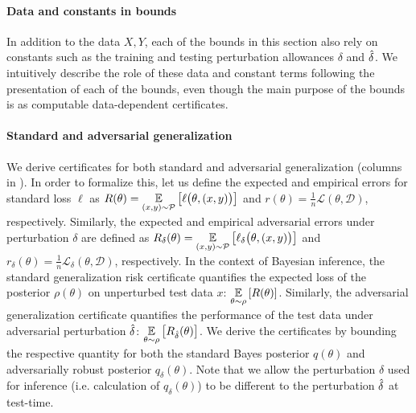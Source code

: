 \paragraph{Data and constants in bounds} In addition to the data $X, Y$, each of the bounds in this section also rely on constants such as the training and testing perturbation allowances $\delta$ and $\hat{\delta}$.
We intuitively describe the role of these data and constant terms following the presentation of each of the bounds, even though the main purpose of the bounds is as computable data-dependent certificates.

\paragraph{Standard and adversarial generalization}
We derive certificates for both standard and adversarial generalization (columns in ). In order to formalize this, let us define the expected and empirical errors for standard loss $\ell$ as $R(\theta)=\underset{(x,y) \sim \mathcal{P}}{\mathbb{E}}\left[\ell\big(\theta, (x,y)\big)\right]$ and $r(\theta)=\frac{1}{n} \mathcal{L}(\theta, \mathcal{D})$, respectively. Similarly, the expected and empirical adversarial errors under perturbation $\delta$ are defined as $ {R}_\delta(\theta)=\underset{(x,y) \sim \mathcal{P}}{\mathbb{E}}\left[ {\ell}_\delta\big(\theta, (x,y)\big)\right]$ and $ {r}_\delta(\theta)=\frac{1}{n}  \mathcal{L}_\delta(\theta, \mathcal{D})$, respectively. 
In the context of Bayesian inference, the standard generalization risk certificate quantifies the expected loss of the posterior $\rho(\theta)$ on unperturbed test data $x$: $\underset{\theta \sim \rho}{\mathbb{E}}\left[R(\theta)\right]$. %
Similarly, the adversarial generalization certificate quantifies the performance
of the test data under adversarial perturbation $\hat{\delta}$: %
$\underset{\theta \sim \rho}{\mathbb{E}}\left[ {R}_{\hat{\delta}}(\theta)\right]$. %
We derive the certificates by bounding the respective quantity for both the standard Bayes posterior $q(\theta)$ and adversarially robust posterior $ {q}_\delta(\theta)$.
Note that we allow the perturbation $\delta$ used for inference (i.e. calculation of $ {q}_\delta(\theta)$) to be different to the perturbation $\hat{\delta}$ at test-time.


